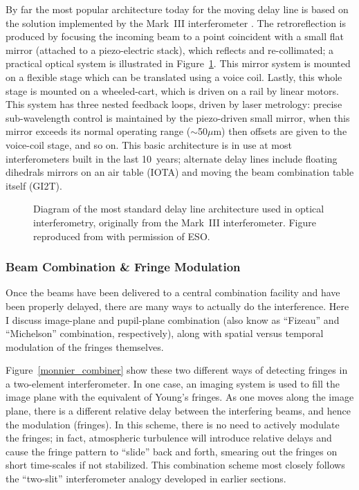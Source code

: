 \documentclass[12pt]{iopart}
\begin{document}
By far the most popular architecture today for the moving delay line
is based on the solution implemented by the Mark~III interferometer
\citep{markiii,colavita1992}.  The retroreflection is produced by
focusing the incoming beam to a point coincident with a small flat
mirror (attached to a piezo-electric stack), which reflects and 
re-collimated; a practical optical system is illustrated in
Figure~\ref{jpl_dl}.  This mirror system is mounted on a flexible
stage which can be translated using a voice coil.  Lastly, this whole
stage is mounted on a wheeled-cart, which is driven on a rail by
linear motors.  This system has three nested feedback loops, driven by
laser metrology: precise sub-wavelength control is maintained by the
piezo-driven small mirror, when this mirror exceeds its normal
operating range ($\sim$50$\mu$m) then offsets are given to the
voice-coil stage, and so on.  This basic architecture is in use at
most interferometers built in the last 10~years; alternate delay lines
include floating dihedrals mirrors on an air table (IOTA) and moving
the beam combination table itself (GI2T).

\begin{figure}
\begin{center}
\caption
{Diagram of the most standard delay line architecture used
in optical interferometry, originally from the Mark~III interferometer.
Figure reproduced from \citet[][Figure 4]{markiii} with permission of 
ESO.
\label{jpl_dl}}
\end{center}
\end{figure}

\subsubsection{Beam Combination \& Fringe Modulation}
\label{combiners}
Once the beams have been delivered to a central combination facility
and have been properly delayed, there are many ways to actually do the
interference.  Here I discuss image-plane and pupil-plane combination
(also know as ``Fizeau'' and ``Michelson'' combination, respectively),
along with spatial versus temporal modulation of the fringes themselves.

Figure~\ref{monnier_combiner} show these two different ways of
detecting fringes in a two-element interferometer.  In one case, an
imaging system is used to fill the image plane with the equivalent of
Young's fringes.  As one moves along the image plane, there is a
different relative delay between the interfering beams, and hence the
modulation (fringes).  In this scheme, there is no need to actively
modulate the fringes; in fact, atmospheric turbulence will introduce
relative delays and cause the fringe pattern to ``slide'' back and
forth, smearing out the fringes on short time-scales if not
stabilized.  This combination scheme most closely follows the
``two-slit'' interferometer analogy developed in earlier sections.
\end{document}
